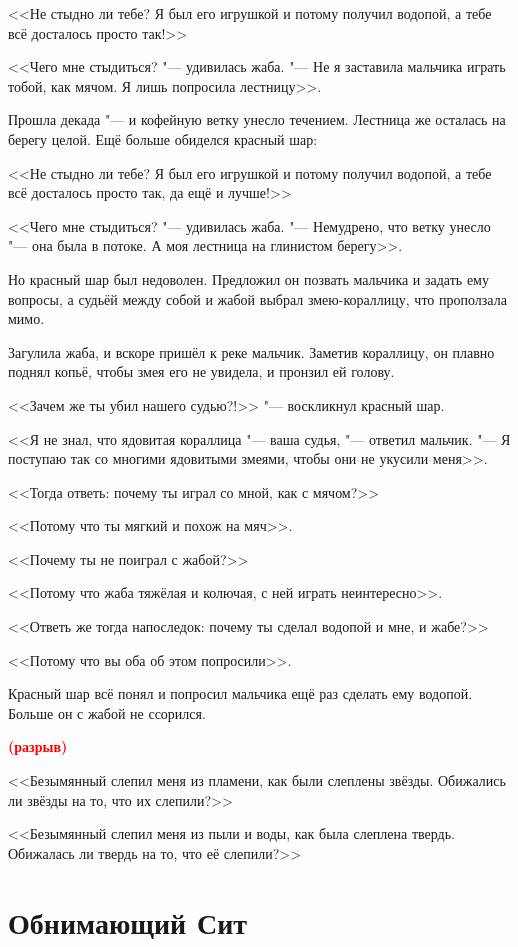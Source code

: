 \documentclass[a4paper,10pt,fleqn]{book}
\newcommand{\spacing}{\textcolor{red}{\textbf{(разрыв)}}}
\begin{document}
<<Не стыдно ли тебе?
Я был его игрушкой и потому получил водопой, а тебе всё досталось просто так!>>

<<Чего мне стыдиться? "--- удивилась жаба.
"--- Не я заставила мальчика играть тобой, как мячом.
Я лишь попросила лестницу>>.

Прошла декада "--- и кофейную ветку унесло течением.
Лестница же осталась на берегу целой.
Ещё больше обиделся красный шар:

<<Не стыдно ли тебе?
Я был его игрушкой и потому получил водопой, а тебе всё досталось просто так, да ещё и лучше!>>

<<Чего мне стыдиться? "--- удивилась жаба.
"--- Немудрено, что ветку унесло "--- она была в потоке.
А моя лестница на глинистом берегу>>.

Но красный шар был недоволен.
Предложил он позвать мальчика и задать ему вопросы, а судьёй между собой и жабой выбрал змею-кораллицу, что проползала мимо.

Загулила жаба, и вскоре пришёл к реке мальчик.
Заметив кораллицу, он плавно поднял копьё, чтобы змея его не увидела, и пронзил ей голову.

<<Зачем же ты убил нашего судью?!>> "--- воскликнул красный шар.

<<Я не знал, что ядовитая кораллица "--- ваша судья, "--- ответил мальчик.
"--- Я поступаю так со многими ядовитыми змеями, чтобы они не укусили меня>>.

<<Тогда ответь: почему ты играл со мной, как с мячом?>>

<<Потому что ты мягкий и похож на мяч>>.

<<Почему ты не поиграл с жабой?>>

<<Потому что жаба тяжёлая и колючая, с ней играть неинтересно>>.

<<Ответь же тогда напоследок: почему ты сделал водопой и мне, и жабе?>>

<<Потому что вы оба об этом попросили>>.

Красный шар всё понял и попросил мальчика ещё раз сделать ему водопой.
Больше он с жабой не ссорился.

\spacing

<<Безымянный слепил меня из пламени, как были слеплены звёзды.
Обижались ли звёзды на то, что их слепили?>>

<<Безымянный слепил меня из пыли и воды, как была слеплена твердь.
Обижалась ли твердь на то, что её слепили?>>

\section{Обнимающий Сит}
\end{document}
